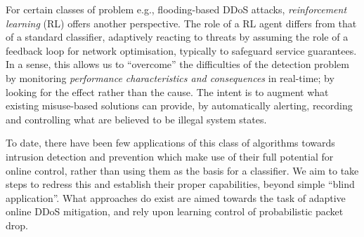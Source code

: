 \documentclass[conference, a4paper, 10pt, times]{IEEEtran}
\begin{document}
For certain classes of problem e.g., flooding-based DDoS attacks, \emph{reinforcement learning} (RL) offers another perspective.
The role of a RL agent differs from that of a standard classifier, adaptively reacting to threats by assuming the role of a feedback loop for network optimisation, typically to safeguard service guarantees.
In a sense, this allows us to ``overcome'' the difficulties of the detection problem by monitoring \emph{performance characteristics and consequences} in real-time; by looking for the effect rather than the cause.
The intent is to augment what existing misuse-based solutions can provide, by automatically alerting, recording and controlling what are believed to be illegal system states.

To date, there have been few applications of this class of algorithms towards intrusion detection and prevention which make use of their full potential for online control, rather than using them as the basis for a classifier.
We aim to take steps to redress this and establish their proper capabilities, beyond simple ``blind application''.
What approaches do exist are aimed towards the task of adaptive online DDoS mitigation, and rely upon learning control of probabilistic packet drop.
\end{document}
